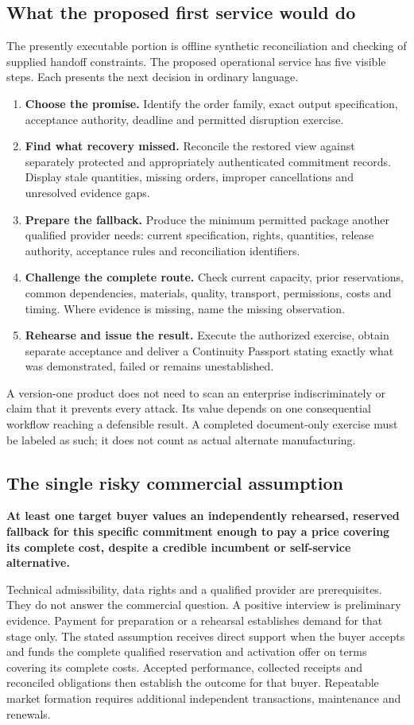 \documentclass[11pt,a4paper]{article}
\begin{document}
\subsection{What the proposed first service would do}
The presently executable portion is offline synthetic reconciliation and checking of supplied handoff constraints. The proposed operational service has five visible steps. Each presents the next decision in ordinary language.
\begin{enumerate}
\item \textbf{Choose the promise.} Identify the order family, exact output specification, acceptance authority, deadline and permitted disruption exercise.
\item \textbf{Find what recovery missed.} Reconcile the restored view against separately protected and appropriately authenticated commitment records. Display stale quantities, missing orders, improper cancellations and unresolved evidence gaps.
\item \textbf{Prepare the fallback.} Produce the minimum permitted package another qualified provider needs: current specification, rights, quantities, release authority, acceptance rules and reconciliation identifiers.
\item \textbf{Challenge the complete route.} Check current capacity, prior reservations, common dependencies, materials, quality, transport, permissions, costs and timing. Where evidence is missing, name the missing observation.
\item \textbf{Rehearse and issue the result.} Execute the authorized exercise, obtain separate acceptance and deliver a Continuity Passport stating exactly what was demonstrated, failed or remains unestablished.
\end{enumerate}
A version-one product does not need to scan an enterprise indiscriminately or claim that it prevents every attack. Its value depends on one consequential workflow reaching a defensible result. A completed document-only exercise must be labeled as such; it does not count as actual alternate manufacturing.

\subsection{The single risky commercial assumption}
\begin{insight}
\textbf{At least one target buyer values an independently rehearsed, reserved fallback for this specific commitment enough to pay a price covering its complete cost, despite a credible incumbent or self-service alternative.}
\end{insight}
Technical admissibility, data rights and a qualified provider are prerequisites. They do not answer the commercial question. A positive interview is preliminary evidence. Payment for preparation or a rehearsal establishes demand for that stage only. The stated assumption receives direct support when the buyer accepts and funds the complete qualified reservation and activation offer on terms covering its complete costs. Accepted performance, collected receipts and reconciled obligations then establish the outcome for that buyer. Repeatable market formation requires additional independent transactions, maintenance and renewals.
\end{document}
